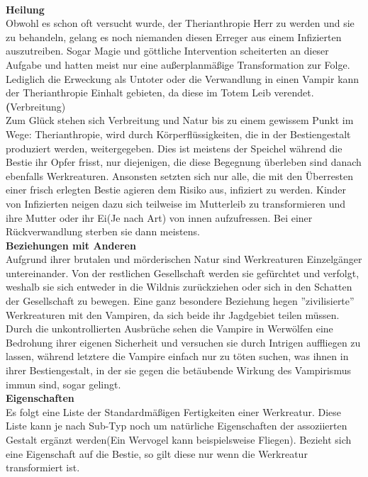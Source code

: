 \documentclass[a4paper,12pt,oneside]{book}
\begin{document}
\begin{description}
\\\textbf{Heilung}
\\Obwohl es schon oft versucht wurde, der Therianthropie Herr zu werden und sie zu behandeln, gelang es noch niemanden diesen Erreger aus einem Infizierten auszutreiben. Sogar Magie und göttliche Intervention scheiterten an dieser Aufgabe und hatten meist nur eine außerplanmäßige Transformation zur Folge.
Lediglich die Erweckung als Untoter oder die Verwandlung in einen Vampir kann der Therianthropie Einhalt gebieten, da diese im Totem Leib verendet.
\\\textbf(Verbreitung)
\\Zum Glück stehen sich Verbreitung und Natur bis zu einem gewissem Punkt im Wege: Therianthropie, wird durch Körperflüssigkeiten, die in der Bestiengestalt produziert werden, weitergegeben. Dies ist meistens der Speichel während die Bestie ihr Opfer frisst, nur diejenigen, die diese Begegnung überleben sind danach ebenfalls Werkreaturen. Ansonsten setzten sich nur alle, die mit den Überresten einer frisch erlegten Bestie agieren dem Risiko aus, infiziert zu werden. Kinder von Infizierten neigen dazu sich teilweise im Mutterleib zu transformieren und ihre Mutter oder ihr Ei(Je nach Art) von innen aufzufressen. Bei einer Rückverwandlung sterben sie dann meistens.
\\\textbf{Beziehungen mit Anderen}
\\Aufgrund ihrer brutalen und mörderischen Natur sind Werkreaturen Einzelgänger untereinander. Von der restlichen Gesellschaft werden sie gefürchtet und verfolgt, weshalb sie sich entweder in die Wildnis zurückziehen oder sich in den Schatten der Gesellschaft zu bewegen. Eine ganz besondere Beziehung hegen ''zivilisierte'' Werkreaturen mit den Vampiren, da sich beide ihr Jagdgebiet teilen müssen. Durch die unkontrollierten Ausbrüche sehen die Vampire in Werwölfen eine Bedrohung ihrer eigenen Sicherheit und versuchen sie durch Intrigen auffliegen zu lassen, während letztere die Vampire einfach nur zu töten suchen, was ihnen in ihrer Bestiengestalt, in der sie gegen die betäubende Wirkung des Vampirismus immun sind, sogar gelingt. 
\\\textbf{Eigenschaften}
\\Es folgt eine Liste der Standardmäßigen Fertigkeiten einer Werkreatur. Diese Liste kann je nach Sub-Typ noch um natürliche Eigenschaften der assoziierten Gestalt ergänzt werden(Ein Wervogel kann beispielsweise Fliegen). Bezieht sich eine Eigenschaft auf die Bestie, so gilt diese nur wenn die Werkreatur transformiert ist.

\end{description}
\end{document}
